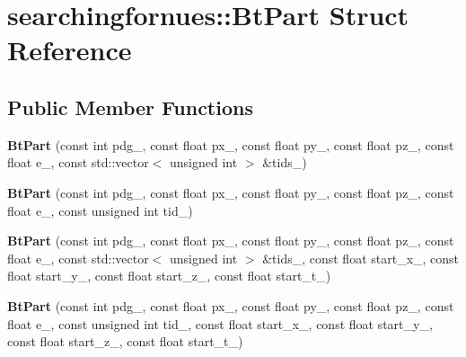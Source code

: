 \hypertarget{structsearchingfornues_1_1BtPart}{\section{searchingfornues\-:\-:Bt\-Part Struct Reference}
\label{structsearchingfornues_1_1BtPart}
}
\subsection*{Public Member Functions}
\begin{DoxyCompactItemize}
\item 
\hypertarget{structsearchingfornues_1_1BtPart_a00003f0908892d8a64f80a8b3f2e6f90}{{\bfseries Bt\-Part} (const int pdg\-\_\-, const float px\-\_\-, const float py\-\_\-, const float pz\-\_\-, const float e\-\_\-, const std\-::vector$<$ unsigned int $>$ \&tids\-\_\-)}\label{structsearchingfornues_1_1BtPart_a00003f0908892d8a64f80a8b3f2e6f90}

\item 
\hypertarget{structsearchingfornues_1_1BtPart_a69048423846c19666791da82138ce613}{{\bfseries Bt\-Part} (const int pdg\-\_\-, const float px\-\_\-, const float py\-\_\-, const float pz\-\_\-, const float e\-\_\-, const unsigned int tid\-\_\-)}\label{structsearchingfornues_1_1BtPart_a69048423846c19666791da82138ce613}

\item 
\hypertarget{structsearchingfornues_1_1BtPart_a558eabb4a0b1bf1b67f7652feb5b2c7d}{{\bfseries Bt\-Part} (const int pdg\-\_\-, const float px\-\_\-, const float py\-\_\-, const float pz\-\_\-, const float e\-\_\-, const std\-::vector$<$ unsigned int $>$ \&tids\-\_\-, const float start\-\_\-x\-\_\-, const float start\-\_\-y\-\_\-, const float start\-\_\-z\-\_\-, const float start\-\_\-t\-\_\-)}\label{structsearchingfornues_1_1BtPart_a558eabb4a0b1bf1b67f7652feb5b2c7d}

\item 
\hypertarget{structsearchingfornues_1_1BtPart_add22892f64dd5657a0dbe194bc7234aa}{{\bfseries Bt\-Part} (const int pdg\-\_\-, const float px\-\_\-, const float py\-\_\-, const float pz\-\_\-, const float e\-\_\-, const unsigned int tid\-\_\-, const float start\-\_\-x\-\_\-, const float start\-\_\-y\-\_\-, const float start\-\_\-z\-\_\-, const float start\-\_\-t\-\_\-)}\label{structsearchingfornues_1_1BtPart_add22892f64dd5657a0dbe194bc7234aa}

\end{DoxyCompactItemize}
